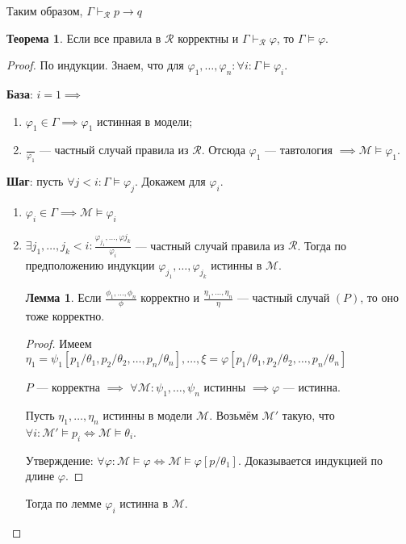 \documentclass[12pt]{article}
\let\im\rightarrow
\let\ds\displaystyle
\theoremstyle{definition}
\newtheorem{theorem}{Теорема}[section]
\theoremstyle{statement}
\theoremstyle{theorem}
\newtheorem{lemma}{Лемма}[section]
\begin{document}
Таким образом, $\Gamma \vdash_{\mathcal{R}} p \im q$

\begin{theorem}
  Если все правила в $\mathcal{R}$ корректны и $\Gamma
  \vdash_{\mathcal{R}} \varphi$, то $\Gamma \models \varphi$.
  \begin{proof}
    По индукции. Знаем, что для $\varphi_1, \dots, \varphi_n \colon
    \forall i \colon \Gamma \models \varphi_i$.

    \textbf{База}: $i = 1 \implies$
    \begin{enumerate}
      \item $\varphi_1 \in \Gamma \implies \varphi_1$ истинная в модели;

      \item $\ds\frac{}{\varphi_1}$ --- частный случай правила из
        $\mathcal{R}$. Отсюда $\varphi_1$ --- тавтология $\implies
        \mathcal{M} \models \varphi_1$.
    \end{enumerate}

    \textbf{Шаг}: пусть $\forall j < i \colon \Gamma \models
    \varphi_j$. Докажем для $\varphi_i$.

    \begin{enumerate}
      \item $\varphi_i \in \Gamma \implies \mathcal{M} \models \varphi_i$

      \item $\exists j_1, \dots, j_k < i \colon \ds\frac{\varphi_{j_1},
        \dots, \varphi{j_k}}{\varphi_i}$ --- частный случай правила
        из $\mathcal{R}$. Тогда по предположению индукции
        $\varphi_{j_1}, \dots, \varphi_{j_k}$ истинны в $\mathcal{M}$.

        \begin{lemma}
          Если $\ds\frac{\phi_1, \dots, \phi_n}{\phi}$ корректно и
          $\frac{\eta_1, \dots, \eta_n}{\eta}$ --- частный случай
          $(P)$, то оно тоже корректно.
          \begin{proof}
            Имеем $\eta_1 = \psi_1[p_1/\theta_1, p_2/\theta_2, \dots,
            p_n /\theta_n], \dots, \xi = \varphi[p_1/\theta_1, p_2/\theta_2,
            \dots, p_n/\theta_n]$

            $P$ --- корректна $\implies$ $\forall \mathcal{M} \colon
            \psi_1, \dots, \psi_n$ истинны $\implies \varphi$ --- истинна.

            Пусть $\eta_1, \dots, \eta_n$ истинны в модели
            $\mathcal{M}$. Возьмём $\mathcal{M}'$ такую, что
            $\forall i \colon \mathcal{M}' \models p_i \iff \mathcal{M} \models
            \theta_i$.

            Утверждение: $\forall \varphi \colon \mathcal{M} \models
            \varphi \iff \mathcal{M} \models \varphi[p / \theta_1]$.
            Доказывается индукцией по длине $\varphi$.
          \end{proof}
        \end{lemma}
        Тогда по лемме $\varphi_i$ истинна в $\mathcal{M}$.
    \end{enumerate}
  \end{proof}
\end{theorem}
\end{document}
